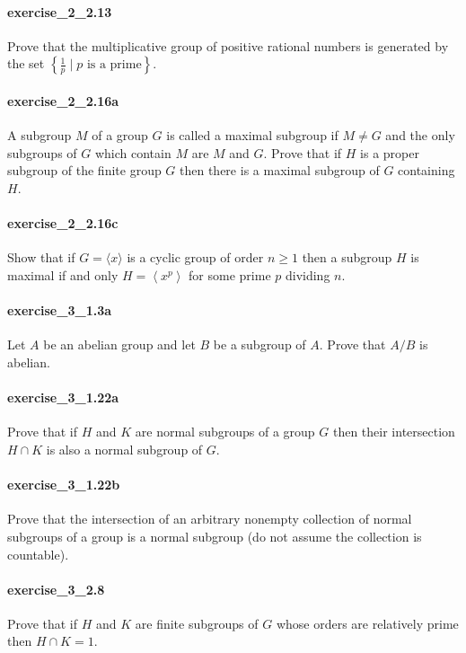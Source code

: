 \documentclass{article}
\begin{document}
\paragraph{exercise\_2\_2.13} Prove that the multiplicative group of positive rational numbers is generated by the set $\left\{\frac{1}{p} \mid \text{$p$ is a prime} \right\}$.

\paragraph{exercise\_2\_2.16a} A subgroup $M$ of a group $G$ is called a maximal subgroup if $M \neq G$ and the only subgroups of $G$ which contain $M$ are $M$ and $G$. Prove that if $H$ is a proper subgroup of the finite group $G$ then there is a maximal subgroup of $G$ containing $H$.

\paragraph{exercise\_2\_2.16c} Show that if $G=\langle x\rangle$ is a cyclic group of order $n \geq 1$ then a subgroup $H$ is maximal if and only $H=\left\langle x^{p}\right\rangle$ for some prime $p$ dividing $n$.

\paragraph{exercise\_3\_1.3a} Let $A$ be an abelian group and let $B$ be a subgroup of $A$. Prove that $A / B$ is abelian.

\paragraph{exercise\_3\_1.22a} Prove that if $H$ and $K$ are normal subgroups of a group $G$ then their intersection $H \cap K$ is also a normal subgroup of $G$.

\paragraph{exercise\_3\_1.22b} Prove that the intersection of an arbitrary nonempty collection of normal subgroups of a group is a normal subgroup (do not assume the collection is countable).

\paragraph{exercise\_3\_2.8} Prove that if $H$ and $K$ are finite subgroups of $G$ whose orders are relatively prime then $H \cap K=1$.
\end{document}
